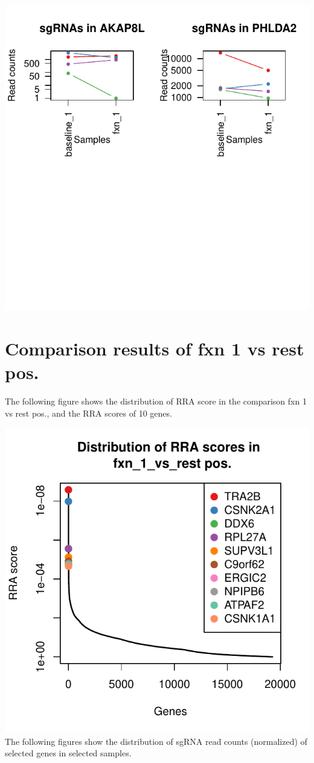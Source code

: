 \documentclass{article}
\begin{document}
\includegraphics{defaultTest_defaultNormCount_screen1_summary-007}

\newpage\section{Comparison results of fxn 1 vs rest pos.}

The following figure shows the distribution of RRA score in the comparison fxn 1 vs rest pos., and the RRA scores of 10 genes.

%


\includegraphics{defaultTest_defaultNormCount_screen1_summary-009}
\clearpage
\newpage
The following figures show the distribution of sgRNA read counts (normalized) of selected genes in selected samples.
%
\end{document}
